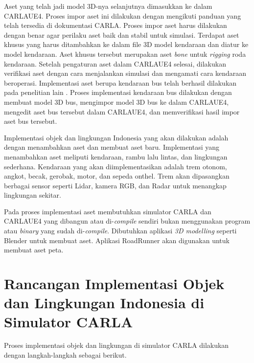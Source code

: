 Aset yang telah jadi model 3D-nya selanjutnya dimasukkan ke dalam CARLAUE4.
Proses impor aset ini dilakukan dengan mengikuti panduan yang telah tersedia di
dokumentasi CARLA. Proses impor aset harus dilakukan dengan benar agar perilaku
aset baik dan stabil untuk simulasi. Terdapat aset khusus yang harus ditambahkan
ke dalam file 3D model kendaraan dan diatur ke model kendaraan. Aset khusus
tersebut merupakan aset \textit{bone} untuk \textit{rigging} roda kendaraan.
Setelah pengaturan aset dalam CARLAUE4 selesai, dilakukan verifikasi aset dengan
cara menjalankan simulasi dan mengamati cara kendaraan beroperasi. Implementasi
aset berupa kendaraan bus telah berhasil dilakukan pada penelitian lain
\parencite{related-work-xiang}. Proses implementasi kendaraan bus dilakukan
dengan membuat model 3D bus, mengimpor model 3D bus ke dalam CARLAUE4, mengedit
aset bus tersebut dalam CARLAUE4, dan memverifikasi hasil impor aset bus
tersebut.


Implementasi objek dan lingkungan Indonesia yang akan dilakukan adalah dengan
menambahkan aset dan membuat aset baru. Implementasi yang menambahkan aset
meliputi kendaraan, rambu lalu lintas, dan lingkungan sederhana. Kendaraan yang
akan diimplementasikan adalah trem otonom, angkot, becak, gerobak, motor, dan
sepeda onthel. Trem akan dipasangkan berbagai sensor seperti Lidar, kamera RGB,
dan Radar untuk menangkap lingkungan sekitar.



Pada proses implementasi aset membutuhkan simulator CARLA dan CARLAUE4 yang
dibangun atau di-\textit{compile} sendiri bukan menggunakan program atau
\textit{binary} yang sudah di-\textit{compile}.
Dibutuhkan aplikasi \textit{3D modelling} seperti Blender untuk membuat aset.
Aplikasi RoadRunner akan digunakan untuk membuat aset peta.

\section{Rancangan Implementasi Objek dan Lingkungan Indonesia di Simulator CARLA}
Proses implementasi objek dan lingkungan di simulator CARLA dilakukan dengan
langkah-langkah sebagai berikut.


